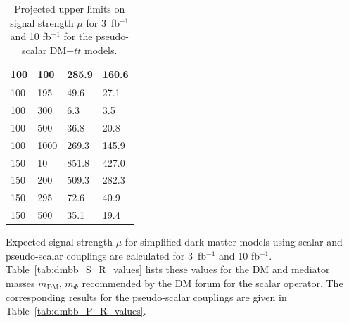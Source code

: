 \begin{table}
\begin{minipage}{.45\textwidth}
{\begin{tabular}{llll}
    100     & 100     & 285.9   & 160.6 \\ \hline
    100     & 195     & 49.6    & 27.1 \\ \hline
    100     & 300     & 6.3     & 3.5 \\ \hline
    100     & 500     & 36.8    & 20.8 \\ \hline
    100     & 1000    & 269.3   & 145.9 \\ \hline
    150     & 10      & 851.8   & 427.0 \\ \hline
    150     & 200     & 509.3   & 282.3 \\ \hline
    150     & 295     & 72.6    & 40.9 \\ \hline
    150     & 500     & 35.1    & 19.4 \\ \hline
  \end{tabular}
  \caption{Projected  upper limits on signal strength $\mu$ for 3~fb$^{-1}$ and 10 fb$^{-1}$ for the pseudo-scalar DM+$t\bar{t}$ models. \label{tab:dmtt_P_R_values}}
}\end{minipage}
\end{table}




Expected signal strength $\mu$ for simplified dark matter models using scalar and pseudo-scalar couplings are calculated for 3~fb$^{-1 }$ and 10 fb$^{-1 }$. Table~\ref{tab:dmbb_S_R_values} lists these values for the DM and mediator masses $m_\textrm{DM}$, $m_\Phi$ recommended by the DM forum for the scalar operator. The corresponding results for the pseudo-scalar couplings are given in Table~\ref{tab:dmbb_P_R_values}. 


